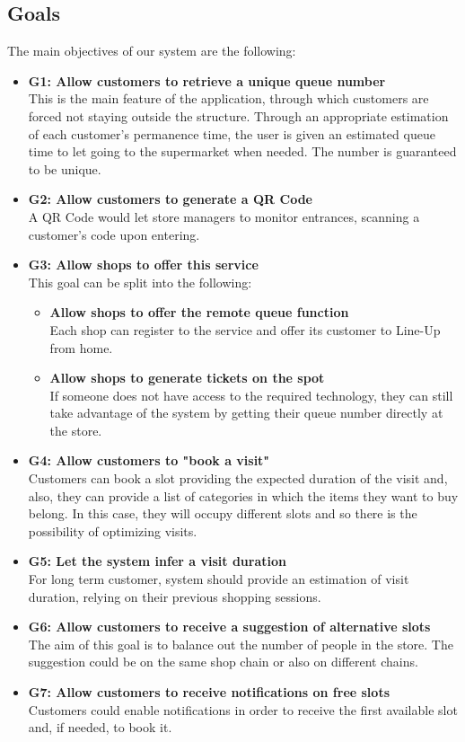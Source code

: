 \documentclass[12pt]{article}
\begin{document}
\subsection{Goals}
The main objectives of our system are the following:
\begin{itemize}
    \item {\textbf{G1: Allow customers to retrieve a unique queue number}\\This is the main feature of the application, through which customers are forced not staying outside the structure. Through an appropriate estimation of each customer's permanence time, the user is given an estimated queue time to let going to the supermarket when needed. The number is guaranteed to be unique.}
    \item {\textbf{G2: Allow customers to generate a QR Code}\\A QR Code would let store managers to monitor entrances, scanning a customer's code upon entering.}
    \item {\textbf{G3: Allow shops to offer this service}\\This goal can be split into the following:
          \begin{itemize}
              \item {\textbf{Allow shops to offer the remote queue function}\\Each shop can register to the service and offer its customer to Line-Up from home.}
              \item {\textbf{Allow shops to generate tickets on the spot}\\If someone does not have access to the required technology, they can still take advantage of the system by getting their queue number directly at the store.}
          \end{itemize}
          }
    \item {\textbf{G4: Allow customers to "book a visit"}\\Customers can book a slot providing the expected duration of the visit and, also, they can provide a list of categories in which the items they want to buy belong. In this case, they will occupy different slots and so there is the possibility of optimizing visits.}
    \item {\textbf{G5: Let the system infer a visit duration}\\For long term customer, system should provide an estimation of visit duration, relying on their previous shopping sessions.}
    \item {\textbf{G6: Allow customers to receive a suggestion of alternative slots}\\The aim of this goal is to balance out the number of people in the store. The suggestion could be on the same shop chain or also on different chains.}
    \item {\textbf{G7: Allow customers to receive notifications on free slots}\\Customers could enable notifications in order to receive the first available slot and, if needed, to book it.}
\end{itemize}
\end{document}
